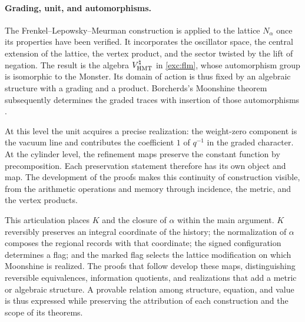\paragraph{Grading, unit, and automorphisms.}
\label{inc-ampl-automorfismos}
The Frenkel--Lepowsky--Meurman construction is applied to the lattice
$N_\alpha$ once its properties have been verified. It incorporates the
oscillator space, the central extension of the lattice, the vertex product,
and the sector twisted by the lift of negation. The result is the algebra
$V^\natural_{\rm HMT}$ in \eqref{exc:flm}, whose automorphism group is
isomorphic to the Monster. Its domain of action is thus fixed by an
algebraic structure with a grading and a product. Borcherds's Moonshine
theorem subsequently determines the graded traces with insertion of those
automorphisms \cite{flm,borcherds}.

At this level the unit acquires a precise realization: the weight-zero
component is the vacuum line and contributes the coefficient $1$ of $q^{-1}$
in the graded character. At the cylinder level, the refinement maps preserve
the constant function by precomposition. Each preservation statement
therefore has its own object and map. The development of the proofs makes
this continuity of construction visible, from the arithmetic operations and
memory through incidence, the metric, and the vertex products.

This articulation places $K$ and the closure of $\alpha$ within the main
argument. $K$ reversibly preserves an integral coordinate of the history;
the normalization of $\alpha$ composes the regional records with that
coordinate; the signed configuration determines a flag; and the marked flag
selects the lattice modification on which Moonshine is realized. The proofs
that follow develop these maps, distinguishing reversible equivalences,
information quotients, and realizations that add a metric or algebraic
structure. A provable relation among structure, equation, and value is thus
expressed while preserving the attribution of each construction and the scope
of its theorems.
